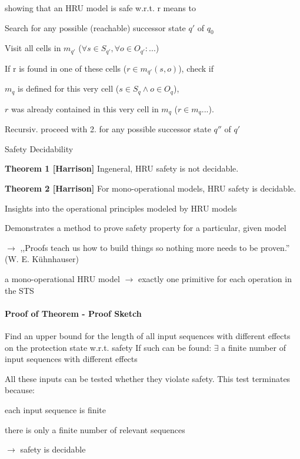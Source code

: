 \documentclass[a4paper]{article}
\renewcommand{\note}[2]{\begin{noteBox} \textbf{#1} #2 \end{noteBox}}
\begin{document}
\begin{multicols}{3}
    showing that an HRU model is safe w.r.t. r means to
    \begin{enumerate*}
        \item Search for any possible (reachable) successor state $q'$ of $q_0$
        \item Visit all cells in $m_{q'}$ ($\forall s\in S_{q'},\forall o\in O_{q'}:...$)
        \item If r is found in one of these cells ($r\in m_{q'}(s,o)$), check if
        \begin{itemize*}
            \item $m_q$ is defined for this very cell ($s\in S_q\wedge o\in O_q$),
            \item $r$ was already contained in this very cell in $m_q$ ($r\in m_q...$).
        \end{itemize*}
        \item Recursiv. proceed with 2. for any possible successor state $q''$ of $q'$
    \end{enumerate*}

    Safety Decidability
    \note{Theorem 1 [Harrison]}{Ingeneral, HRU safety is not decidable.}

    \note{Theorem 2 [Harrison]}{For mono-operational models, HRU safety is decidable.}
    \begin{itemize*}
        \item Insights into the operational principles modeled by HRU models
        \item Demonstrates a method to prove safety property for a particular, given model
        \item[$\rightarrow$] ,,Proofs teach us how to build things so nothing more needs to be proven.'' (W. E. Kühnhauser)
    \end{itemize*}

    a mono-operational HRU model $\rightarrow$ exactly one primitive for each operation in the STS

    \paragraph{Proof of Theorem - Proof Sketch}
    \begin{enumerate*}
        \item Find an upper bound for the length of all input sequences with different effects on the protection state w.r.t. safety
        If such can be found: $\exists$ a finite number of input sequences with different effects
        \item All these inputs can be tested whether they violate safety. This test terminates because:
        \begin{itemize*}
            \item each input sequence is finite
            \item there is only a finite number of relevant sequences
        \end{itemize*}
        \item[$\rightarrow$] safety is decidable
    \end{enumerate*}


\end{multicols}
\end{document}
